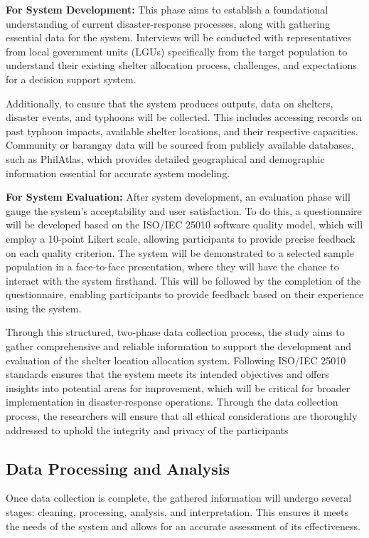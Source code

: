 	\textbf{For System Development:} This phase aims to establish a foundational understanding of current disaster-response processes, along with gathering essential data for the system. Interviews will be conducted with representatives from local government units (LGUs) specifically from the target population to understand their existing shelter allocation process, challenges, and expectations for a decision support system. 
	
	Additionally, to ensure that the system produces outputs, data on shelters, disaster events, and typhoons will be collected. This includes accessing records on past typhoon impacts, available shelter locations, and their respective capacities. Community or barangay data will be sourced from publicly available databases, such as PhilAtlas, which provides detailed geographical and demographic information essential for accurate system modeling.
	
	\textbf{For System Evaluation:} After system development, an evaluation phase will gauge the system’s acceptability and user satisfaction. To do this, a questionnaire will be developed based on the ISO/IEC 25010 software quality model, which will employ a 10-point Likert scale, allowing participants to provide precise feedback on each quality criterion. The system will be demonstrated to a selected sample population in a face-to-face presentation, where they will have the chance to interact with the system firsthand. This will be followed by the completion of the questionnaire, enabling participants to provide feedback based on their experience using the system.
	
	Through this structured, two-phase data collection process, the study aims to gather comprehensive and reliable information to support the development and evaluation of the shelter location allocation system. Following ISO/IEC 25010 standards ensures that the system meets its intended objectives and offers insights into potential areas for improvement, which will be critical for broader implementation in disaster-response operations. Through the data collection process, the researchers will ensure that all ethical considerations are thoroughly addressed to uphold the integrity and privacy of the participants

\subsection{Data Processing and Analysis}
	Once data collection is complete, the gathered information will undergo several stages: cleaning, processing, analysis, and interpretation. This ensures it meets the needs of the system and allows for an accurate assessment of its effectiveness.
	
